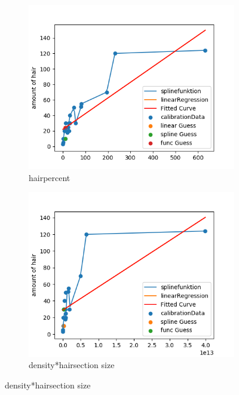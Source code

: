 \documentclass[german,a4paper, 12pt]{llncs}
\begin{document}
\begin{figure}[H] %
	\begin{subfigure}{0.48\textwidth}
		\includegraphics[width=1.1\linewidth]{figBina/g7.png}
		\caption{hairpercent} \label{fig:a}
	\end{subfigure}\hspace*{\fill}
	\begin{subfigure}{0.48\textwidth}
		\includegraphics[width=1.1\linewidth]{figBina/g8.png}
		\caption{density*hairsection size} \label{fig:b}
	\end{subfigure}
	

\end{figure}
\end{document}
